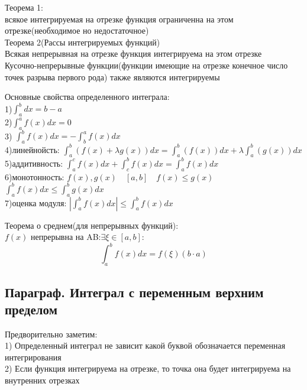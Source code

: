 \documentclass[a4paper, 12pt]{article}
\begin{document}
\begin{mdframed}[backgroundcolor=blue!20] 
        Теорема 1:\\
        всякое  интегрируемая на отрезке функция ограниченна на этом отрезке(необходимое но недостаточное)\\

        Теорема 2(Рассы интегрируемых функций)\\
        Всякая непрерывная на отрезке функция интегрируема на этом отрезке\\
        Кусочно-непрерывные функции(функции имеющие на отрезке конечное число точек разрыва первого рода) также являются интегрируемы\\

     \end{mdframed}

Основные свойства определенного интеграла:\\
1)$ \int_{a}^{b}dx = b - a  $ \\
2)$ \int_{a}^{a}f\left(x\right)dx = 0 $ \\
3) $ \int_{a}^{b}f\left(x\right)dx = - \int_{b}^{a}f\left(x\right)dx   $ \\
4)линейнойсть: $ \int_{a}^{b}\left(f(x) + \lambda g(x)\right)dx= \int_{a}^{b}\left(f(x)\right)dx + \lambda \int_{a}^{b}\left(g(x)\right)dx    $ \\
5)аддитивность: $ \int_{a}^{c}f\left(x\right)dx + \int_{c}^{b}f\left(x\right)dx = \int_{a}^{b}f\left(x\right)dx  $ \\ 
6)монотонность: $ f(x),g(x) \quad [a,b] \quad f(x) \leq g(x) $\\
$ \int_{a}^{b}f\left(x\right)dx \leq \int_{a}^{b}g\left(x\right)dx $  \\
7)оценка модуля: $ \left| \int_{a}^{b}f\left(x\right)dx\right| \leq \int_{a}^{b}f\left(x\right)dx   $\\
\begin{mdframed}[backgroundcolor=blue!20] 
        Теорема о среднем(для непрерывных функций):\\
        $ f(x) $ непрерывна на AB:$ \exists \xi \in [a,b] $:
        \[
            \int_{a}^{b}f\left(x\right)dx= f(\xi)(b\cdot a) 
          \]  
     \end{mdframed}



\subsection{Параграф. Интеграл с переменным верхним пределом}
Предворительно заметим:\\
1) Определенный интеграл не зависит какой буквой обозначается переменная интегрирования\\
2) Если функция интегрируема на отрезке, то точка она будет интегрируема на внутренних отрезках\\
\end{document}
